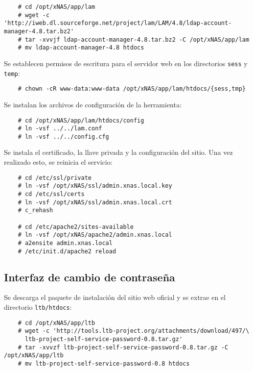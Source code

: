 {
\scriptsize
\linespread{1}
\begin{verbatim}
    # cd /opt/xNAS/app/lam
    # wget -c 'http://iweb.dl.sourceforge.net/project/lam/LAM/4.8/ldap-account-manager-4.8.tar.bz2'
    # tar -xvvjf ldap-account-manager-4.8.tar.bz2 -C /opt/xNAS/app/lam
    # mv ldap-account-manager-4.8 htdocs
\end{verbatim}
}

Se establecen permisos de escritura para el servidor web en los directorios \texttt{sess} y \texttt{temp}:

{
\scriptsize
\linespread{1}
\begin{verbatim}
    # chown -cR www-data:www-data /opt/xNAS/app/lam/htdocs/{sess,tmp}
\end{verbatim}
}

Se instalan los archivos de configuraci\'{o}n de la herramienta:

{
\scriptsize
\linespread{1}
\begin{verbatim}
    # cd /opt/xNAS/app/lam/htdocs/config
    # ln -vsf ../../lam.conf
    # ln -vsf ../../config.cfg
\end{verbatim}
}

Se instala el certificado, la llave privada y la configuraci\'{o}n del sitio. Una vez realizado esto, se reinicia el servicio:

{
\scriptsize
\linespread{1}
\begin{verbatim}
    # cd /etc/ssl/private
    # ln -vsf /opt/xNAS/ssl/admin.xnas.local.key
    # cd /etc/ssl/certs
    # ln -vsf /opt/xNAS/ssl/admin.xnas.local.crt
    # c_rehash

    # cd /etc/apache2/sites-available
    # ln -vsf /opt/xNAS/apache2/admin.xnas.local
    # a2ensite admin.xnas.local
    # /etc/init.d/apache2 reload
\end{verbatim}
}

      \subsection {Interfaz de cambio de contrase\~{n}a}

Se descarga el paquete de instalaci\'{o}n del sitio web oficial y se extrae en el directorio \texttt{ltb/htdocs}:

{
\scriptsize
\linespread{1}
\begin{verbatim}
    # cd /opt/xNAS/app/ltb
    # wget -c 'http://tools.ltb-project.org/attachments/download/497/\
      ltb-project-self-service-password-0.8.tar.gz'
    # tar -xvvzf ltb-project-self-service-password-0.8.tar.gz -C /opt/xNAS/app/ltb
    # mv ltb-project-self-service-password-0.8 htdocs
\end{verbatim}
}

